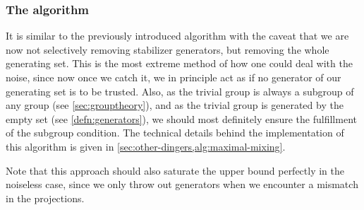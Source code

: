 \subsubsection{The algorithm}
It is
similar to the previously introduced algorithm with the caveat that we are now
not selectively removing stabilizer generators, but removing the whole
generating set. This is the most extreme method of how one could deal with the
noise, since now once we catch it, we in principle act as if no generator of
our generating set is to be trusted. Also, as the trivial group is always a
subgroup of any group (see \cref{sec:grouptheory}), and as the trivial group is
generated by the empty set (see \cref{defn:generators}), we should most
definitely ensure the fulfillment of the subgroup condition. The technical
details behind the implementation of this algorithm is given in
\cref{sec:other-dingers,alg:maximal-mixing}.

Note that this approach should also saturate the upper bound perfectly in the
noiseless case, since we only throw out generators when we encounter a mismatch
in the projections.



